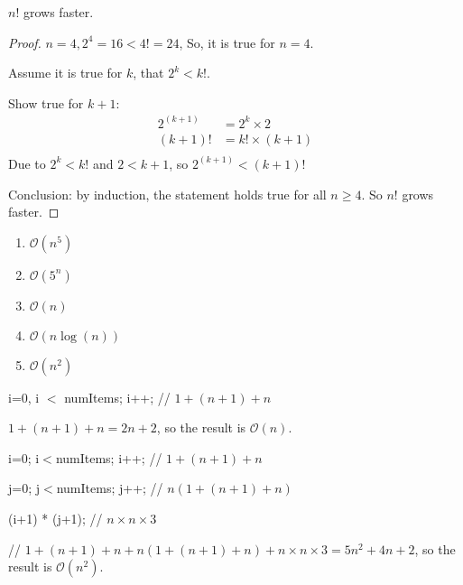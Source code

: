 \begin{homeworkProblem}
$n!$ grows faster.

\begin{proof}

\BaseCase $n = 4, 2^4=16 < 4!=24$, So, it is true for $n = 4$.

\InductionStep Assume it is true for $k$, that $2^k < k!$.

Show true for $k+1$:
\begin{equation*}
\begin{split}
2^{(k+1)} & = 2^k \times 2\\
(k+1)!  & = k! \times (k+1)\\
\end{split}
\end{equation*}
Due to $2^k < k!$ and $2 < k+1$, so $2^{(k+1)} < (k+1)!$

Conclusion:  by induction, the statement holds true for all $n \geq 4$.
So $n!$ grows faster.
\end{proof}
\end{homeworkProblem}

\begin{homeworkProblem}
\begin{enumerate}[label=(\alph*)]
\item $\mathcal{O}(n^5)$

\item $\mathcal{O}(5^n)$

\item $\mathcal{O}(n)$

\item $\mathcal{O}(n\log(n))$

\item $\mathcal{O}(n^2)$
\end{enumerate}
\end{homeworkProblem}

\begin{homeworkProblem}
i=0, i $<$ numItems; i++;  // $1 + (n+1) + n$

$1 + (n+1) + n = 2n + 2$, so the result is $\mathcal{O}(n)$.
\end{homeworkProblem}

\begin{homeworkProblem}
i=0; i$<$numItems; i++;   // $1 + (n+1) + n$

j=0; j$<$numItems; j++;   // $n(1 + (n+1) + n)$

(i+1) * (j+1);              // $n\times n\times 3$

// $1 + (n+1) + n + n(1 + (n+1) + n) + n\times n\times 3 = 5n^2 + 4n + 2$, so the result is $\mathcal{O}(n^2)$.
\end{homeworkProblem}

